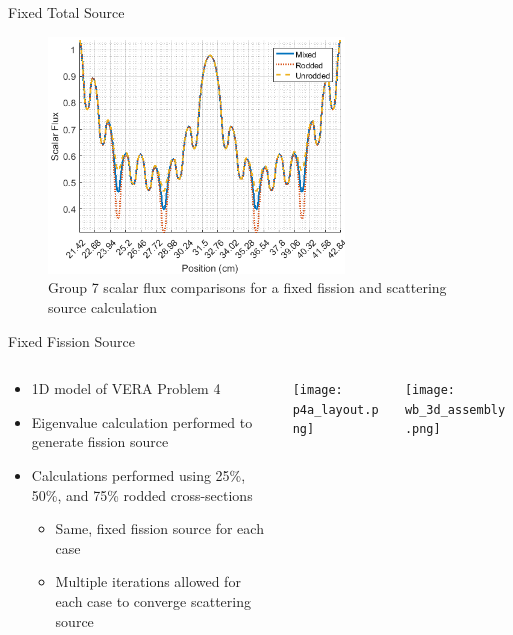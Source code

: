 
\begin{frame}[t]{Fixed Total Source}

\begin{figure}[H]
    \centering
    \includegraphics[width=0.7\textwidth]{../figs/1dmoc-50mix-fixedscat-scalflux7.png}
    \caption{Group 7 scalar flux comparisons for a fixed fission and scattering source calculation}\label{f:1dmoc-fixed-50-scalflux7}
\end{figure}

\end{frame}


\begin{frame}[t]{Fixed Fission Source}
    
    \begin{columns}
        \begin{column}{0.5\textwidth}
    \begin{itemize}
      \item 1D model of VERA Problem 4
      \item Eigenvalue calculation performed to generate fission source
      \item Calculations performed using 25\%, 50\%, and 75\% rodded 
      cross-sections
      \begin{itemize}
        \item Same, fixed fission source for each case
        \item Multiple iterations allowed for each case to converge scattering 
        source
      \end{itemize}
    \end{itemize}
\end{column}
\begin{column}{0.28\textwidth}
\texttt{[image: p4a\_layout.png]}
\end{column}
\begin{column}{0.22\textwidth}
\texttt{[image: wb\_3d\_assembly.png]}
\end{column}
\end{columns}
    
\end{frame}

